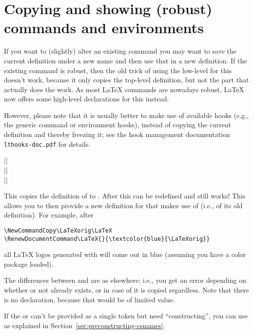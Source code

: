 \documentclass{ltxguide}
\begin{document}
\section{Copying and showing (robust) commands and environments}

If you want to (slightly) alter an existing command you may want to
save the current definition under a new name and then use that in a
new definition. If the existing command is robust, then the old trick of
using the low-level  for this doesn't work, because it only
copies the top-level definition, but not the part that actually does
the work. As most \LaTeX{} commands are nowadays robust, \LaTeX{}
now offers some high-level declarations for this instead.

However, please note that it is usually better to make use of
available hooks (e.g., the generic command or environment hooks),
instead of copying the current definition and thereby freezing it; see
the hook management documentation \texttt{lthooks-doc.pdf} for
details.

\begin{decl}
  |\NewCommandCopy|         \\
  |\RenewCommandCopy|       \\
  |\DeclareCommandCopy|    
\end{decl}

This copies the definition of  to . After
this  can be redefined and 
still works! This allows you to then provide a new definition for
 that makes use of  (i.e., of its old
definition). For example, after
\begin{verbatim}
\NewCommandCopy\LaTeXorig\LaTeX
\RenewDocumentCommand\LaTeX{}{\textcolor{blue}{\LaTeXorig}}
\end{verbatim}
all \LaTeX{} logos generated with  will come out in blue
(assuming you have a color package loaded).

The differences between  and  are as
elsewhere: i.e., you get an error depending on whether or not
 already exists, or in case of  it is copied
regardless. Note that there is no  declaration, because
that would be of limited value.


If the  or  can't be provided as a single
token but need \enquote{constructing}, you can use 
as explained in
Section~\ref{sec:preconstructing-csnames}.
\end{document}
